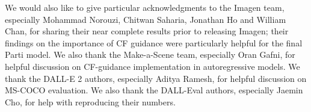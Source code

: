 We would also like to give particular acknowledgments to the Imagen team, especially Mohammad Norouzi, Chitwan Saharia, Jonathan Ho and William Chan, for sharing their near complete results prior to releasing Imagen; their findings on the importance of CF guidance were particularly helpful for the final Parti model. We also thank the Make-a-Scene team, especially Oran Gafni, for helpful discussion on CF-guidance implementation in autoregressive models. We thank the DALL-E 2 authors, especially Aditya Ramesh, for helpful discussion on MS-COCO evaluation. We also thank the DALL-Eval authors, especially Jaemin Cho, for help with reproducing their numbers.


